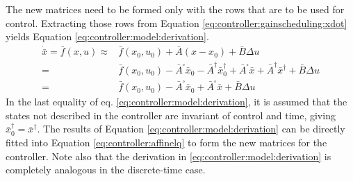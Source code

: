     The new matrices need to be formed only with the rows that are to be used
    for control. Extracting those rows from Equation \eqref{eq:controller:gainscheduling:xdot}
    yields Equation \eqref{eq:controller:model:derivation}.
    \begin{equation}
        \label{eq:controller:model:derivation}
        \begin{array}{rl}
             \dot{\bar{x}} = \bar{f}(x,u) \approx & \bar{f}(x_{0},u_{0}) + \bar{A}(x - x_{0}) + \bar{B}\Delta u \\
             = & \bar{f}(x_{0},u_{0}) - \bar{A}^{\square}\bar{x}_{0} - \bar{A}^{\dagger}\bar{x}^{\dagger}_{0} + \bar{A}^{\square}\bar{x} + \bar{A}^{\dagger}\bar{x}^{\dagger} + \bar{B}\Delta u \\
             = & \bar{f}(x_{0},u_{0}) - \bar{A}^{\square}\bar{x}_{0} + \bar{A}^{\square}\bar{x} + \bar{B}\Delta u
        \end{array}
    \end{equation}
    In the last equality of eq. \eqref{eq:controller:model:derivation}, it
    is assumed that the states not described in the controller are invariant
    of control and time, giving $\bar{x}^{\dagger}_{0} = \bar{x}^{\dagger}$.
    The results of Equation \eqref{eq:controller:model:derivation} can be
    directly fitted into Equation \eqref{eq:controller:affinelq} to form
    the new matrices for the controller.
    Note also that the derivation in \eqref{eq:controller:model:derivation} is
    completely analogous in the discrete-time case.
